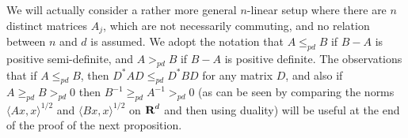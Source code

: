 We will actually consider a rather more general $n$-linear setup
where there are $n$ distinct matrices $A_j$, which are not
necessarily commuting, and no relation between $n$ and $d$ is assumed.
We adopt the notation that $A \leq_{pd} B$
if $B-A$ is positive semi-definite, and $A
>_{pd} B$ if $B-A$ is positive definite.
The observations that if $A \leq_{pd} B$, then $D^* A D
\leq_{pd} D^* B D$ for any matrix $D$, and also if $A \geq_{pd} B
>_{pd} 0$ then $B^{-1} \geq_{pd} A^{-1} >_{pd} 0$ (as can be seen
by comparing the norms $\langle Ax, x \rangle^{1/2}$ and $\langle
Bx, x \rangle^{1/2}$ on ${\hbox{\bf R}}^d$ and then using duality) will be useful at
the end of the proof of the next proposition.

